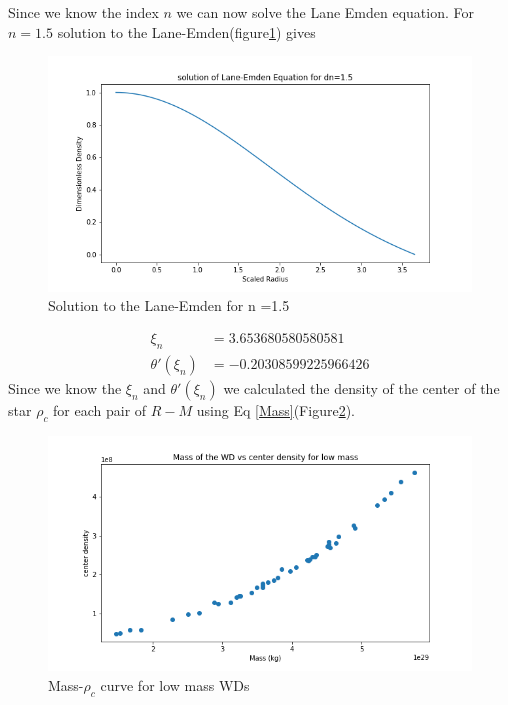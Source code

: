 \documentclass[aps,twocolumn,showpacs,preprintnumbers,nofootinbib,prl,superscriptaddress,groupedaddress]{revtex4-1}
\begin{document}
Since we know the index $n$ we can now solve the Lane Emden equation. For $n=1.5$ solution to the Lane-Emden(figure\ref{fig:solution-for-n1}) gives
\begin{figure}\label{n=1.5}
	\centering
	\includegraphics[width=1.0\linewidth]{"Figures/n15 lane emden"}
	\caption{Solution to the Lane-Emden for n =1.5}
	\label{fig:solution-for-n1}
\end{figure}
\begin{align}
\xi_n &= 3.653680580580581 \nonumber \\
\theta'(\xi_n) &= -0.20308599225966426\nonumber
\end{align}
Since we know the $ \xi_n $ and $ \theta'(\xi_n) $ we calculated the density of the center of the star $\rho_c$ for each pair of $R-M$ using Eq \ref{Mass}(Figure\ref{fig:rhoc-m-curve}).
\begin{figure}
	\centering
	\includegraphics[width=1.0\linewidth]{"Figures/rho_c-mass"}
	\caption{Mass-$\rho_c$ curve for low mass WDs}
	\label{fig:rhoc-m-curve}
\end{figure}
\end{document}
